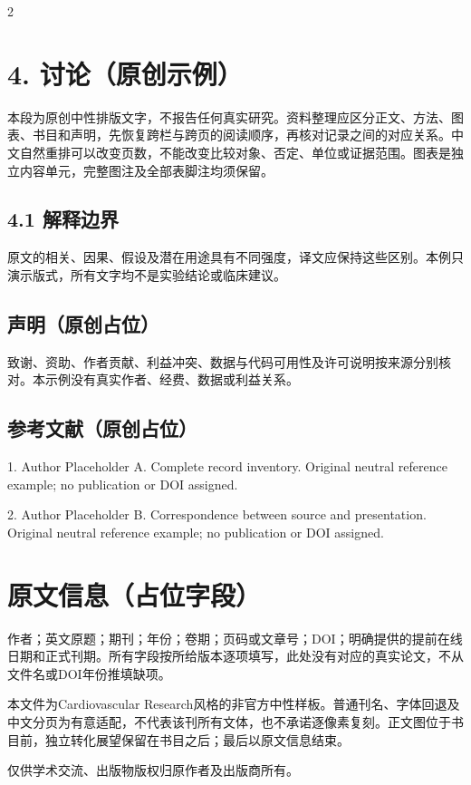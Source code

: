 \documentclass[UTF8,fontset=none,scheme=plain]{ctexart}
\newcommand{\CVRBody}{本段为原创中性排版文字，不报告任何真实研究。资料整理应区分正文、方法、图表、书目和声明，先恢复跨栏与跨页的阅读顺序，再核对记录之间的对应关系。中文自然重排可以改变页数，不能改变比较对象、否定、单位或证据范围。图表是独立内容单元，完整图注及全部表脚注均须保留。}
\begin{document}
\begin{multicols}{2}
\section*{4. 讨论（原创示例）}
\CVRBody
\subsection*{4.1 解释边界}
原文的相关、因果、假设及潜在用途具有不同强度，译文应保持这些区别。本例只演示版式，所有文字均不是实验结论或临床建议。
\subsection*{声明（原创占位）}
致谢、资助、作者贡献、利益冲突、数据与代码可用性及许可说明按来源分别核对。本示例没有真实作者、经费、数据或利益关系。
\subsection*{参考文献（原创占位）}
{\fontsize{7.6bp}{10bp}\selectfont\setlength{\parindent}{0pt}
\hypertarget{cvr-ref:1}{}1. Author Placeholder A. Complete record inventory. Original neutral reference example; no publication or DOI assigned.\par\smallskip
\hypertarget{cvr-ref:2}{}2. Author Placeholder B. Correspondence between source and presentation. Original neutral reference example; no publication or DOI assigned.\par}
\end{multicols}\vspace{14bp}
\begingroup\setlength{\fboxsep}{8bp}\setlength{\fboxrule}{.5bp}\noindent{}\endgroup\vspace{14bp}
\section*{原文信息（占位字段）}
作者；英文原题；期刊；年份；卷期；页码或文章号；DOI；明确提供的提前在线日期和正式刊期。所有字段按所给版本逐项填写，此处没有对应的真实论文，不从文件名或DOI年份推填缺项。\par
本文件为Cardiovascular Research风格的非官方中性样板。普通刊名、字体回退及中文分页为有意适配，不代表该刊所有文体，也不承诺逐像素复刻。正文图位于书目前，独立转化展望保留在书目之后；最后以原文信息结束。\par
仅供学术交流、出版物版权归原作者及出版商所有。
\end{document}
